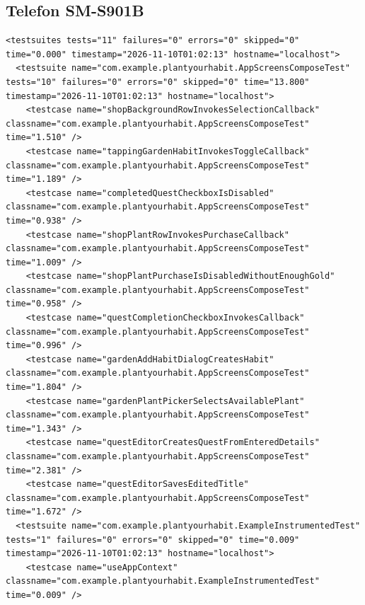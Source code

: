 \documentclass[a4paper,12pt]{article}
\begin{document}
\subsection{Telefon SM-S901B}
\begin{verbatim}
<testsuites tests="11" failures="0" errors="0" skipped="0" time="0.000" timestamp="2026-11-10T01:02:13" hostname="localhost">
  <testsuite name="com.example.plantyourhabit.AppScreensComposeTest" tests="10" failures="0" errors="0" skipped="0" time="13.800" timestamp="2026-11-10T01:02:13" hostname="localhost">
    <testcase name="shopBackgroundRowInvokesSelectionCallback" classname="com.example.plantyourhabit.AppScreensComposeTest" time="1.510" />
    <testcase name="tappingGardenHabitInvokesToggleCallback" classname="com.example.plantyourhabit.AppScreensComposeTest" time="1.189" />
    <testcase name="completedQuestCheckboxIsDisabled" classname="com.example.plantyourhabit.AppScreensComposeTest" time="0.938" />
    <testcase name="shopPlantRowInvokesPurchaseCallback" classname="com.example.plantyourhabit.AppScreensComposeTest" time="1.009" />
    <testcase name="shopPlantPurchaseIsDisabledWithoutEnoughGold" classname="com.example.plantyourhabit.AppScreensComposeTest" time="0.958" />
    <testcase name="questCompletionCheckboxInvokesCallback" classname="com.example.plantyourhabit.AppScreensComposeTest" time="0.996" />
    <testcase name="gardenAddHabitDialogCreatesHabit" classname="com.example.plantyourhabit.AppScreensComposeTest" time="1.804" />
    <testcase name="gardenPlantPickerSelectsAvailablePlant" classname="com.example.plantyourhabit.AppScreensComposeTest" time="1.343" />
    <testcase name="questEditorCreatesQuestFromEnteredDetails" classname="com.example.plantyourhabit.AppScreensComposeTest" time="2.381" />
    <testcase name="questEditorSavesEditedTitle" classname="com.example.plantyourhabit.AppScreensComposeTest" time="1.672" />
  <testsuite name="com.example.plantyourhabit.ExampleInstrumentedTest" tests="1" failures="0" errors="0" skipped="0" time="0.009" timestamp="2026-11-10T01:02:13" hostname="localhost">
    <testcase name="useAppContext" classname="com.example.plantyourhabit.ExampleInstrumentedTest" time="0.009" />
\end{verbatim}
\end{document}
